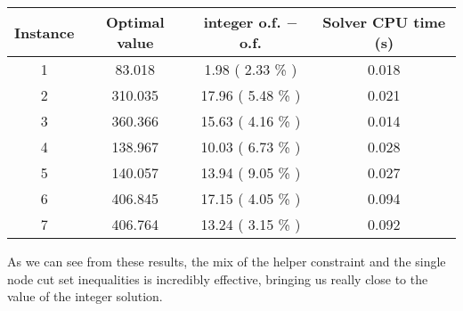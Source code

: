 \begin{table}[h!]
	\centering
	\begin{tabular}{|c|c|c|c|}
		\hline
		\textbf{Instance} & \textbf{Optimal value} & \textbf{integer o.f. $-$ o.f.} & \textbf{Solver CPU time (s)} \\
		\hline
		1 &  83.018 &  1.98 ( 2.33 \% ) & 0.018 \\ \hline
		2 & 310.035 & 17.96 ( 5.48 \% ) & 0.021 \\ \hline
		3 & 360.366 & 15.63 ( 4.16 \% ) & 0.014 \\ \hline
		4 & 138.967 & 10.03 ( 6.73 \% ) & 0.028 \\ \hline
		5 & 140.057 & 13.94 ( 9.05 \% ) & 0.027 \\ \hline
		6 & 406.845 & 17.15 ( 4.05 \% ) & 0.094 \\ \hline
		7 & 406.764 & 13.24 ( 3.15 \% ) & 0.092 \\ \hline
	\end{tabular}
	\label{tab:instance_costs}
\end{table}

As we can see from these results, the mix of the helper constraint and the single node cut set inequalities is incredibly effective, bringing us really close to the value of the integer solution.
